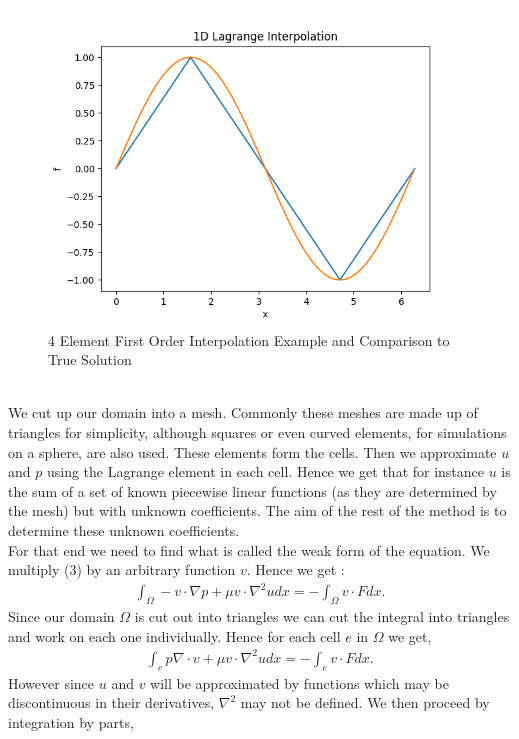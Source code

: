 \documentclass[11pt,twoside,a4paper]{article}
\begin{document}
\begin{figure}
  \includegraphics[width=\linewidth]{ex_1D_LG.png}
  \caption{4 Element First Order Interpolation Example and Comparison to True Solution}
\end{figure}
\\
We cut up our domain into a mesh. Commonly these meshes are made up of triangles for simplicity, although squares or even curved elements, for simulations on a sphere, are also used. These elements form the cells. Then we approximate $u$ and $p$ using the Lagrange element in each cell. Hence we get that for instance $u$ is the sum of a set of known piecewise linear functions (as they are determined by the mesh) but with unknown coefficients. The aim of the rest of the method is to determine these unknown coefficients.\\
For that end we need to find what is called the weak form of the equation. We multiply (3) by an arbitrary function $v$. Hence we get :
\begin{align*}
\int_{\Omega} -v \cdot \nabla p + \mu v \cdot \nabla^2 u dx = -\int_{\Omega} v \cdot F dx .
\end{align*}
Since our domain $\Omega$ is cut out into triangles we can cut the integral into triangles and work on each one individually. Hence for each cell $e$ in $\Omega$ we get,
\begin{align*}
\int_{e} p \nabla \cdot v + \mu v \cdot \nabla^2 u dx =  -\int_{e} v \cdot F dx .
\end{align*}
However since $u$ and $v$ will be approximated by functions which may be discontinuous in their derivatives, $\nabla^2$ may not be defined. We then proceed by integration by parts,
\end{document}
